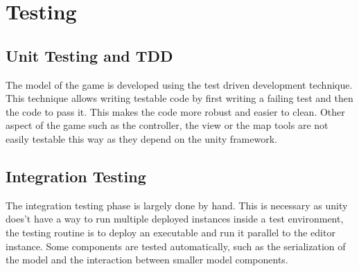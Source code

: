 \documentclass{article}
\begin{document}
\clearpage

\section{Testing}
\subsection{Unit Testing and TDD}
The model of the game is developed using the test driven development technique. This technique allows writing testable code by first writing a failing test and then the code to pass it. This makes the code more robust and easier to clean. Other aspect of the game such as the controller, the view or the map tools are not easily testable this way as they depend on the unity framework. 
\subsection{Integration Testing}
The integration testing phase is largely done by hand. This is necessary as unity does't have a way to run multiple deployed instances inside a test environment, the testing routine is to deploy an executable and run it parallel to the editor instance. Some components are tested automatically, such as the serialization of the model and the interaction between smaller model components.

\clearpage


\end{document}

